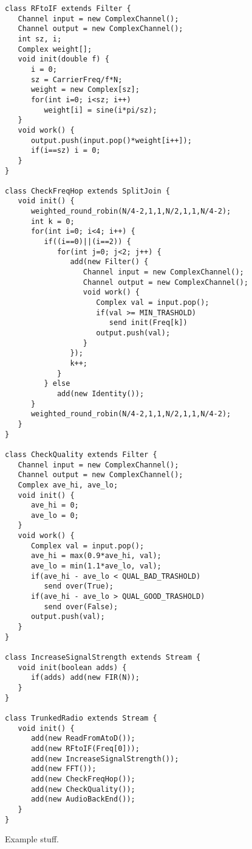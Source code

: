\begin{figure}[t]
\scriptsize
\begin{verbatim}
class RFtoIF extends Filter {
   Channel input = new ComplexChannel();
   Channel output = new ComplexChannel();
   int sz, i;
   Complex weight[];
   void init(double f) {
      i = 0;
      sz = CarrierFreq/f*N;
      weight = new Complex[sz];
      for(int i=0; i<sz; i++)
         weight[i] = sine(i*pi/sz);
   }
   void work() {
      output.push(input.pop()*weight[i++]);
      if(i==sz) i = 0;
   }
}

class CheckFreqHop extends SplitJoin {
   void init() {
      weighted_round_robin(N/4-2,1,1,N/2,1,1,N/4-2);
      int k = 0;
      for(int i=0; i<4; i++) {
         if((i==0)||(i==2)) {
            for(int j=0; j<2; j++) {
               add(new Filter() {
                  Channel input = new ComplexChannel();
                  Channel output = new ComplexChannel();
                  void work() {
                     Complex val = input.pop();
                     if(val >= MIN_TRASHOLD)
                        send init(Freq[k])
                     output.push(val);
                  }
               });
               k++;
            }
         } else
            add(new Identity());
      }
      weighted_round_robin(N/4-2,1,1,N/2,1,1,N/4-2);
   }
}

class CheckQuality extends Filter {
   Channel input = new ComplexChannel();
   Channel output = new ComplexChannel();
   Complex ave_hi, ave_lo;   
   void init() {
      ave_hi = 0;
      ave_lo = 0;
   }
   void work() {
      Complex val = input.pop();
      ave_hi = max(0.9*ave_hi, val);
      ave_lo = min(1.1*ave_lo, val);
      if(ave_hi - ave_lo < QUAL_BAD_TRASHOLD)
         send over(True);
      if(ave_hi - ave_lo > QUAL_GOOD_TRASHOLD)
         send over(False);
      output.push(val);
   }
}

class IncreaseSignalStrength extends Stream {
   void init(boolean adds) {
      if(adds) add(new FIR(N));
   }
}

class TrunkedRadio extends Stream {
   void init() {
      add(new ReadFromAtoD());
      add(new RFtoIF(Freq[0]));
      add(new IncreaseSignalStrength());
      add(new FFT());
      add(new CheckFreqHop());
      add(new CheckQuality());
      add(new AudioBackEnd());
   }
}

\end{verbatim}
\vspace{-12pt}
\caption{\protect\small Example stuff.
\protect\label{fig1}}
\vspace{-12pt}
\end{figure}
